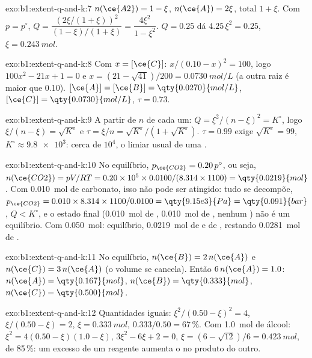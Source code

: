 \begin{solution}{exo:b1:extent-q-and-k:7}
$n(\ce{A2}) = 1 - \xi$, $n(\ce{A}) = 2\xi$, total $1 + \xi$. Com $p =
p^\circ$, $Q = \dfrac{(2\xi/(1+\xi))^2}{(1-\xi)/(1+\xi)} = \dfrac{4\xi^2}{1 -
\xi^2}$. $Q = 0.25$ dá $4.25\,\xi^2 = 0.25$, $\xi = \qty{0.243}{mol}$.
\end{solution}

\begin{solution}{exo:b1:extent-q-and-k:8}
Com $x = [\ce{C}]$: $x/(0.10 - x)^2 = 100$, logo $100x^2 - 21x + 1 = 0$ e
$x = (21 - \sqrt{41})/200 = \qty{0.0730}{mol/L}$ (a outra raiz é maior que
0.10). $[\ce{A}] = [\ce{B}] = \qty{0.0270}{mol/L}$, $[\ce{C}] =
\qty{0.0730}{mol/L}$, $\tau = 0.73$.
\end{solution}

\begin{solution}{exo:b1:extent-q-and-k:9}
A partir de $n$ de cada um: $Q = \xi^2/(n - \xi)^2 = K^\circ$, logo $\xi/(n - \xi) =
\sqrt{K^\circ}$ e $\tau = \xi/n = \sqrt{K^\circ}/(1 + \sqrt{K^\circ})$.
$\tau = 0.99$ exige $\sqrt{K^\circ} = 99$, $K^\circ \approx \num{9.8e3}$:
cerca de $10^4$, o limiar usual de uma .
\end{solution}

\begin{solution}{exo:b1:extent-q-and-k:10}
No equilíbrio, $p_{\ce{CO2}} = 0.20\,p^\circ$, ou seja, $n(\ce{CO2}) =
pV/RT = 0.20 \times 10^5 \times 0.0100/(8.314 \times 1100) =
\qty{0.0219}{mol}$. Com \qty{0.010}{mol} de carbonato, isso não pode
ser atingido: tudo se decompõe, $p_{\ce{CO2}} = 0.010 \times 8.314 \times
1100/0.0100 = \qty{9.15e3}{Pa} = \qty{0.091}{bar}$, $Q < K^\circ$, e o
estado final (\qty{0.010}{mol} de , \qty{0.010}{mol} de ,
nenhum ) não é um equilíbrio. Com \qty{0.050}{mol}: equilíbrio,
\qty{0.0219}{mol} de  e de , restando \qty{0.0281}{mol} de .
\end{solution}

\begin{solution}{exo:b1:extent-q-and-k:11}
No equilíbrio, $n(\ce{B}) = 2\,n(\ce{A})$ e $n(\ce{C}) = 3\,n(\ce{A})$
(o volume se cancela). Então $6\,n(\ce{A}) = 1.0$: $n(\ce{A}) =
\qty{0.167}{mol}$, $n(\ce{B}) = \qty{0.333}{mol}$, $n(\ce{C}) =
\qty{0.500}{mol}$.
\end{solution}

\begin{solution}{exo:b1:extent-q-and-k:12}
Quantidades iguais: $\xi^2/(0.50 - \xi)^2 = 4$, $\xi/(0.50 - \xi) = 2$,
$\xi = \qty{0.333}{mol}$,  $0.333/0.50 = 67\,\%$. Com \qty{1.0}{mol}
de álcool: $\xi^2 = 4(0.50 - \xi)(1.0 - \xi)$, $3\xi^2 - 6\xi + 2 = 0$,
$\xi = (6 - \sqrt{12})/6 = \qty{0.423}{mol}$,  de 85\,\%: um
excesso de um reagente aumenta o  no produto do outro.
\end{solution}

